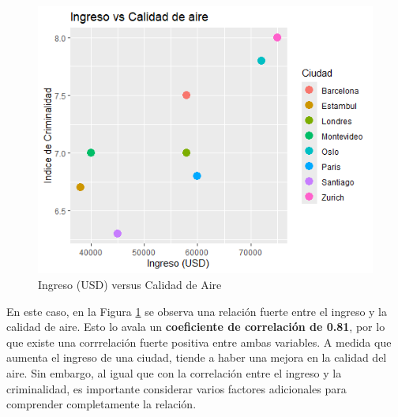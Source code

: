 \documentclass{article}
\begin{document}
\begin{figure}[h!]
    \centering
    \includegraphics[scale = 0.7]{Tarea_1_2bpng.png}
    \caption{Ingreso (USD) versus Calidad de Aire}
    \label{fig:enter-label2}
\end{figure}

En este caso, en la Figura \ref{fig:enter-label2} se observa una relación fuerte entre el ingreso y la calidad de aire. Esto lo avala un \textbf{coeficiente de correlación de 0.81}, por lo que existe una corrrelación fuerte positiva entre ambas variables. A medida que aumenta el ingreso de una ciudad, tiende a haber una mejora en la calidad del aire. Sin embargo, al igual que con la correlación entre el ingreso y la criminalidad, es importante considerar varios factores adicionales para comprender completamente la relación. 
\end{document}
